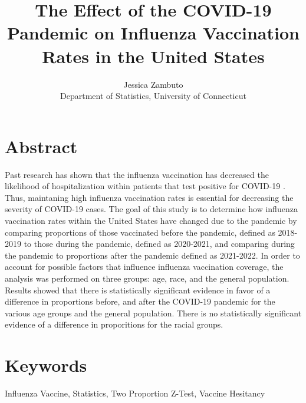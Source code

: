 \documentclass[12pt]{article}
\title{The Effect of the COVID-19 Pandemic on Influenza Vaccination Rates in the United States}
\author{Jessica Zambuto\\
Department of Statistics, University of Connecticut}
\begin{document}
\maketitle
\section*{Abstract}
\label{sec:Abstract}
Past research has shown that the influenza vaccination has decreased the likelihood of hospitalization within patients
that test positive for COVID-19 \citep{conlon2021impact}. Thus, maintaning high influenza vaccination rates is essential
for decreasing the severity of COVID-19 cases. The goal of this study is to determine how influenza vaccination rates within the
United States have changed due to the pandemic by comparing proportions of those vaccinated before the pandemic, defined as 2018-2019
to those during the pandemic, defined as 2020-2021, and comparing during the pandemic to proportions after the pandemic defined as 2021-2022. 
In order to account for possible factors that influence influenza vaccination coverage, the analysis was performed on three groups: age,
race, and the general population. Results showed that there is statistically significant evidence in favor of a difference in proportions before,
and after the COVID-19 pandemic for the various age groups and the general population. There is no statistically significant evidence of a difference
in proporitions for the racial groups.

\section*{Keywords}
\label{sec:Keywords}
Influenza Vaccine, Statistics, Two Proportion Z-Test, Vaccine Hesitancy
\end{document}

